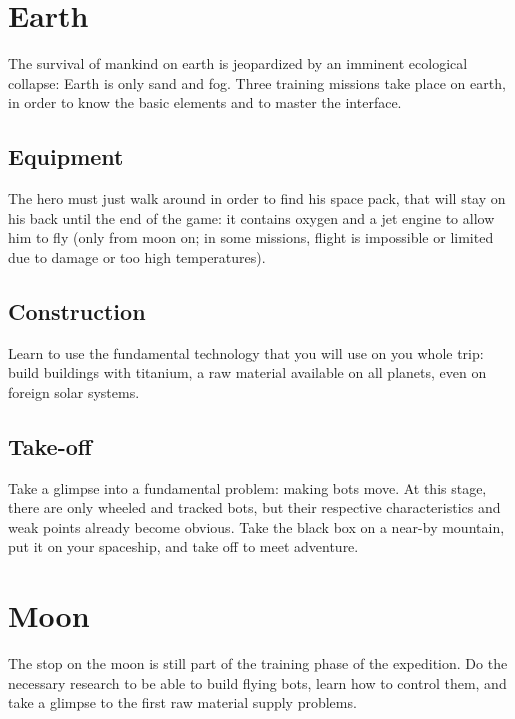 
\newpage
\section{Earth}

The survival of mankind on earth is jeopardized by an imminent ecological collapse: Earth is only sand and fog. Three training missions take place on earth, in order to know the basic elements and to master the interface.


\subsection{Equipment}

The hero must just walk around in order to find his space pack, that will stay on his back until the end of the game: it contains oxygen and a jet engine to allow him to fly (only from moon on; in some missions, flight is impossible or limited due to damage or too high temperatures).


\subsection{Construction}

Learn to use the fundamental technology that you will use on you whole trip: build buildings with titanium, a raw material available on all planets, even on foreign solar systems.


\subsection{Take-off}

Take a glimpse into a fundamental problem: making bots move. At this stage, there are only wheeled and tracked bots, but their respective characteristics and weak points already become obvious. Take the black box on a near-by mountain, put it on your spaceship, and take off to meet adventure.


\newpage
\section{Moon}

The stop on the moon is still part of the training phase of the expedition. Do the necessary research to be able to build flying bots, learn how to control them, and take a glimpse to the first raw material supply problems.


